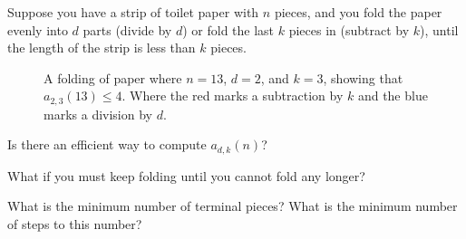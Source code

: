 \documentclass{article}
\begin{document}
  Suppose you have a strip of toilet paper with $n$ pieces, and you fold the
  paper evenly into $d$ parts (divide by $d$) or fold the last $k$ pieces in
  (subtract by $k$), until the length of the strip is less than $k$ pieces.
\begin{figure}[!h]
  \centering
  \caption{
    A folding of paper where $n = 13$, $d = 2$, and $k = 3$, showing that
    $a_{2,3}(13) \leq 4$.
    Where the red marks a subtraction by $k$ and the blue marks a division by $d$.
  }
\end{figure}

\begin{question}
  Is there an efficient way to compute $a_{d,k}(n)$?
\end{question}

\begin{related}
  \item What if you must keep folding until you cannot fold any longer?
  \item What is the minimum number of terminal pieces? What is the minimum number of steps to this number?
\end{related}
\end{document}
